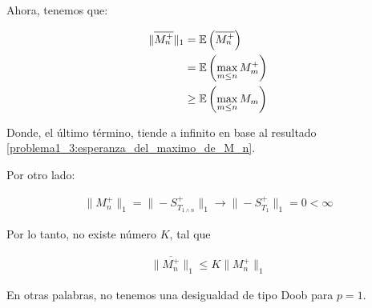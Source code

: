 	Ahora, tenemos que:
    
	\begin{align}
		\|\overline{M_{n}^{+}}\|_1  &=    \mathbb{E}\left({\overline{M_{n}^{+}}}\right)     \\
									&=    \mathbb{E}\left({\max_{m \leq n}M_m^+}\right)     \\
									&\geq \mathbb{E}\left({\max_{m \leq n}M_m}\right)										
	\end{align}\pn
		
	Donde, el último término, tiende a infinito en base al resultado 
	\eqref{problema1_3:esperanza_del_maximo_de_M_n}.\pn

	Por otro lado:
    
	\begin{align}
		\|M_n^+\|_1=\|-S_{T_{1\wedge n}}^{+}\|_1  \longrightarrow  \|-S_{T_1}^+\|_1 = 0 < \infty
	\end{align}\pn
	
	Por lo tanto, no existe número $K$, tal que
	
    \begin{align}
		 \|\overline{M_n^+}\|_1 \leq  K \|M_n^+\|_1
	\end{align}\pn
	
	En otras palabras, no tenemos una desigualdad de tipo Doob para $p=1$.